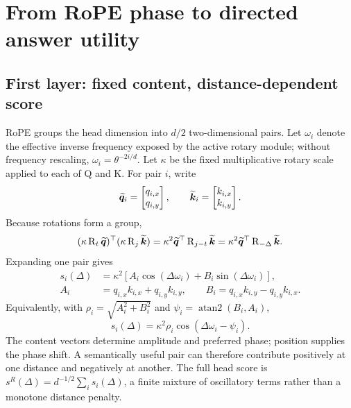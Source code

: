 \section{From RoPE phase to directed answer utility}
\label{sec:mechanism}

\subsection{First layer: fixed content, distance-dependent score}

RoPE groups the head dimension into $d/2$ two-dimensional pairs.  Let
$\omega_i$ denote the effective inverse frequency exposed by the active rotary
module; without frequency rescaling, $\omega_i=\theta^{-2i/d}$.  Let $\kappa$
be the fixed multiplicative rotary scale applied to each of Q and K.  For pair
$i$, write
\begin{equation}
  \widetilde{\bm q}_i=\begin{bmatrix}q_{i,x}\\q_{i,y}\end{bmatrix},\qquad
  \widetilde{\bm k}_i=\begin{bmatrix}k_{i,x}\\k_{i,y}\end{bmatrix}.
\end{equation}
Because rotations form a group,
\begin{equation}
  (\kappa\operatorname{R}_t\widetilde{\bm q})^{\top}(\kappa\operatorname{R}_j\widetilde{\bm k})
  =\kappa^2\widetilde{\bm q}^{\top}\operatorname{R}_{j-t}\widetilde{\bm k}
  =\kappa^2\widetilde{\bm q}^{\top}\operatorname{R}_{-\Delta}\widetilde{\bm k}.
  \label{eq:relative-rope}
\end{equation}
Expanding one pair gives
\begin{align}
  s_i(\Delta)
  &=\kappa^2\!\left[A_i\cos(\Delta\omega_i)+B_i\sin(\Delta\omega_i)\right],
  \label{eq:pair-score}\\
  A_i&=q_{i,x}k_{i,x}+q_{i,y}k_{i,y},\qquad
  B_i=q_{i,x}k_{i,y}-q_{i,y}k_{i,x}.
\end{align}
Equivalently, with $\rho_i=\sqrt{A_i^2+B_i^2}$ and
$\psi_i=\operatorname{atan2}(B_i,A_i)$,
\begin{equation}
  s_i(\Delta)=\kappa^2\rho_i\cos(\Delta\omega_i-\psi_i).
  \label{eq:amplitude-phase}
\end{equation}
The content vectors determine amplitude and preferred phase; position supplies
the phase shift.  A semantically useful pair can therefore contribute
positively at one distance and negatively at another.  The full head score is
$s^R(\Delta)=d^{-1/2}\sum_i s_i(\Delta)$, a finite mixture of oscillatory terms
rather than a monotone distance penalty.

